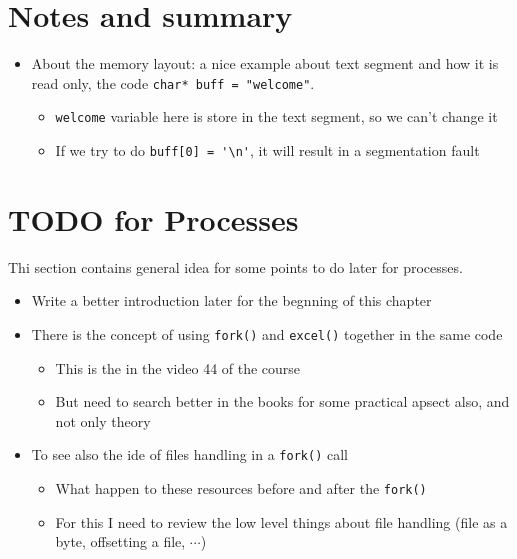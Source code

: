 \documentclass[12pt,a4paper]{book}
\begin{document}
\newpage
\section{Notes and summary}

\begin{itemize}

\item About the memory layout: a nice example about text segment and how it is read only, the code \verb|char* buff = "welcome"|.

    \begin{itemize}
        \item \verb|welcome| variable here is store in the text segment, so we can't change it

        \item If we try to do \verb|buff[0] = '\n'|, it will result in a segmentation fault
    \end{itemize}


\end{itemize}


\newpage
\section{TODO for Processes}

Thi section contains general idea for some points to do later for processes.

\begin{itemize}

\item Write a better introduction later for the begnning of this chapter

\item There is the concept of using \verb|fork()| and \verb|excel()| together in the same code

	\begin{itemize}
	\item This is the in the video 44 of the course
	
	\item But need to search better in the books for some practical apsect also, and not only theory
	\end{itemize}

\item To see also the ide of files handling in a \verb|fork()| call

	\begin{itemize}
	\item What happen to these resources before and after the \verb|fork()|
	
	\item For this I need to review the low level things about file handling (file as a byte, offsetting a file, $\cdots$)
	\end{itemize}

\end{itemize}
\end{document}
